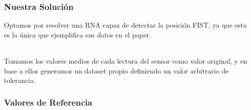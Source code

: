 \documentclass{beamer}
\begin{document}
    \begin{frame}
        \frametitle{Nuestra Solución}
        \hspace*{20pt}Optamos por resolver una RNA capaz de detectar la posición FIST, ya que esta es la única que 
        ejemplifica sus datos en el paper.\\~\

        \hspace*{20pt}Tomamos los valores medios de cada lectura del sensor como valor original, 
        y en base a ellos generamos un dataset propio definiendo un valor arbitrario de tolerancia.
        
    \end{frame} 

    \begin{frame}
        \frametitle{Valores de Referencia}
        \begin{table}[]
            \caption{Características de la señal sEMG, posición de mano FIST.}
            \end{table}
    \end{frame} 
\end{document}
